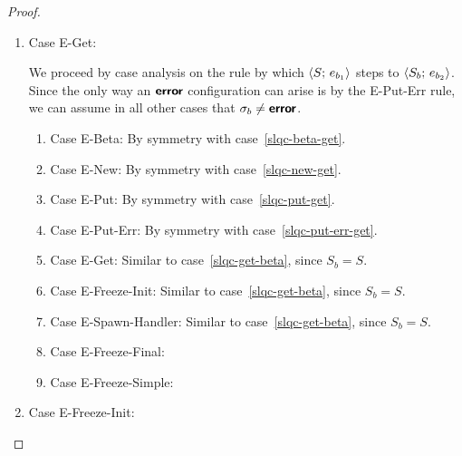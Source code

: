 \begin{proof}
\begin{enumerate}
\begin{enumerate}
    \end{enumerate}
  \item Case {\sc E-Get}:

    We proceed by case analysis on the rule by which
    $\langle S;\, e_{b_1} \rangle$ steps to $\langle S_b;\, e_{b_2} \rangle$.  Since the
    only way an $\textbf{\textsf{error}}$ configuration can arise is by the {\sc
      E-Put-Err} rule, we can assume in all other cases that $\sigma_b
    \neq \textbf{\textsf{error}}$.
    \begin{enumerate}
    \item \label{slqc-get-beta}Case {\sc E-Beta}: By symmetry with case~\ref{slqc-beta-get}.
    \item \label{slqc-get-new}Case {\sc E-New}: By symmetry with case~\ref{slqc-new-get}.
    \item \label{slqc-get-put}Case {\sc E-Put}: By symmetry with case~\ref{slqc-put-get}.
    \item \label{slqc-get-put-err}Case {\sc E-Put-Err}: By symmetry with case~\ref{slqc-put-err-get}.
    \item \label{slqc-get-get}Case {\sc E-Get}: Similar to
      case~\ref{slqc-get-beta}, since $S_b = S$.
    \item \label{slqc-get-freeze-init}Case {\sc E-Freeze-Init}:
      Similar to case~\ref{slqc-get-beta}, since $S_b = S$.
    \item \label{slqc-get-spawn-handler}Case {\sc E-Spawn-Handler}:
      Similar to case~\ref{slqc-get-beta}, since $S_b = S$.
    \item \label{slqc-get-freeze-final}Case {\sc E-Freeze-Final}: \TODO{}
    \item \label{slqc-get-freeze-simple}Case {\sc E-Freeze-Simple}: \TODO{}
    \end{enumerate}

  \item Case {\sc E-Freeze-Init}:


\end{enumerate}
\end{proof}
